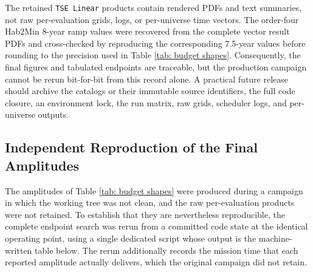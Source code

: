 \documentclass[12pt,a4paper]{article}
\numberwithin{equation}{section}
\numberwithin{figure}{section}
\numberwithin{table}{section}
\begin{document}
The retained \texttt{TSE Linear} products contain rendered PDFs and text summaries, not raw per-evaluation grids, logs, or per-universe time vectors. The order-four Hab2Min 8-year ramp values were recovered from the complete vector result PDFs and cross-checked by reproducing the corresponding 7.5-year values before rounding to the precision used in Table \ref{tab: budget shapes}. Consequently, the final figures and tabulated endpoints are traceable, but the production campaign cannot be rerun bit-for-bit from this record alone. A practical future release should archive the catalogs or their immutable source identifiers, the full code closure, an environment lock, the run matrix, raw grids, scheduler logs, and per-universe outputs.

\subsection{Independent Reproduction of the Final Amplitudes} \label{sec: app: reproduction}
The amplitudes of Table \ref{tab: budget shapes} were produced during a campaign in which the working tree was not clean, and the raw per-evaluation products were not retained. To establish that they are nevertheless reproducible, the complete endpoint search was rerun from a committed code state at the identical operating point, using a single dedicated script whose output is the machine-written table below. The rerun additionally records the mission time that each reported amplitude actually delivers, which the original campaign did not retain.
\end{document}
